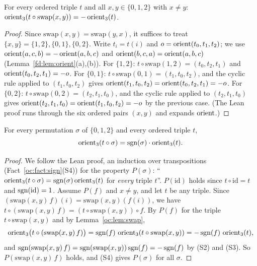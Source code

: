 \begin{lemma}\label{oc:lem:swap}
For every ordered triple $t$ and all $x,y\in\{0,1,2\}$ with $x\ne y$:
$\operatorname{orient}_3(t\circ\mathrm{swap}(x,y))=-\operatorname{orient}_3(t)$.
\end{lemma}
\begin{proof}
Since $\mathrm{swap}(x,y)=\mathrm{swap}(y,x)$, it suffices to treat $\{x,y\}=\{1,2\},\{0,1\},\{0,2\}$.
Write $t_i=t(i)$ and $o=\operatorname{orient}(t_0,t_1,t_2)$; we use $\operatorname{orient}(a,c,b)=-\operatorname{orient}(a,b,c)$ and
$\operatorname{orient}(b,c,a)=\operatorname{orient}(a,b,c)$ (Lemma~\ref{fd:lem:orient}(a),(b)).
For $\{1,2\}$: $t\circ\mathrm{swap}(1,2)=(t_0,t_2,t_1)$ and $\operatorname{orient}(t_0,t_2,t_1)=-o$.
For $\{0,1\}$: $t\circ\mathrm{swap}(0,1)=(t_1,t_0,t_2)$, and the cyclic rule applied to $(t_1,t_0,t_2)$
gives $\operatorname{orient}(t_1,t_0,t_2)=\operatorname{orient}(t_0,t_2,t_1)=-o$.
For $\{0,2\}$: $t\circ\mathrm{swap}(0,2)=(t_2,t_1,t_0)$, and the cyclic rule applied to $(t_2,t_1,t_0)$
gives $\operatorname{orient}(t_2,t_1,t_0)=\operatorname{orient}(t_1,t_0,t_2)=-o$ by the previous case.
(The Lean proof runs through the six ordered pairs $(x,y)$ and expands $\operatorname{orient}$.)
\end{proof}

\begin{lemma}\label{oc:lem:perm}
For every permutation $\sigma$ of $\{0,1,2\}$ and every ordered triple $t$,
\[\operatorname{orient}_3(t\circ\sigma)=\operatorname{sgn}(\sigma)\cdot\operatorname{orient}_3(t).\]
\end{lemma}
\begin{proof}
We follow the Lean proof, an induction over transpositions (Fact~\ref{oc:fact:sign}(S4)) for the
property $P(\sigma)$: ``$\operatorname{orient}_3(t\circ\sigma)=\operatorname{sgn}(\sigma)\operatorname{orient}_3(t)$ for \emph{every} triple
$t$''. $P(\mathrm{id})$ holds since $t\circ\mathrm{id}=t$ and $\operatorname{sgn}(\mathrm{id})=1$. Assume $P(f)$ and
$x\ne y$, and let $t$ be any triple. Since $(\mathrm{swap}(x,y)\,f)(i)=\mathrm{swap}(x,y)(f(i))$, we have
$t\circ(\mathrm{swap}(x,y)\,f)=(t\circ\mathrm{swap}(x,y))\circ f$. By $P(f)$ for the triple
$t\circ\mathrm{swap}(x,y)$ and by Lemma~\ref{oc:lem:swap},
\[\operatorname{orient}_3\bigl(t\circ(\mathrm{swap}(x,y)\,f)\bigr)=\operatorname{sgn}(f)\,\operatorname{orient}_3(t\circ\mathrm{swap}(x,y))
 =-\operatorname{sgn}(f)\,\operatorname{orient}_3(t),\]
and $\operatorname{sgn}(\mathrm{swap}(x,y)\,f)=\operatorname{sgn}(\mathrm{swap}(x,y))\operatorname{sgn}(f)=-\operatorname{sgn}(f)$ by (S2) and (S3). So
$P(\mathrm{swap}(x,y)\,f)$ holds, and (S4) gives $P(\sigma)$ for all $\sigma$.
\end{proof}

